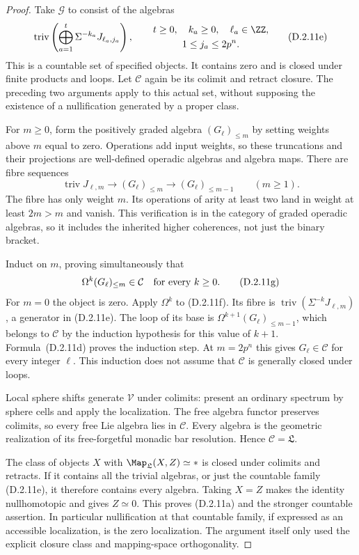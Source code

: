 \begin{proof}
Take $\mathcal G$ to consist of the algebras
\[
 \operatorname{triv}
 \left(\bigoplus_{a=1}^t
       \Sigma^{-k_a}J_{\ell_a,j_a}\right),
 \qquad
 \begin{gathered}
 t\geq0,\quad k_a\geq0,\quad \ell_a\in\ZZ,\\
 1\leq j_a\leq2p^n.
 \end{gathered}
 \tag{D.2.11e}
\]
This is a countable set of specified objects. It contains zero
and is closed under finite products and loops. Let $\mathcal C$
again be its colimit and retract closure. The preceding two
arguments apply to this actual set, without supposing the
existence of a nullification generated by a proper class.

For $m\geq0$, form the positively graded algebra
$(G_\ell)_{\leq m}$ by setting weights above $m$ equal to zero.
Operations add input weights, so these truncations and their
projections are well-defined operadic algebras and algebra maps.
There are fibre sequences
\[
 \operatorname{triv}J_{\ell,m}\longrightarrow
 (G_\ell)_{\leq m}\longrightarrow(G_\ell)_{\leq m-1}
 \qquad(m\geq1).
 \tag{D.2.11f}
\]
The fibre has only weight $m$. Its operations of arity at least
two land in weight at least $2m>m$ and vanish. This verification
is in the category of graded operadic algebras, so it includes
the inherited higher coherences, not just the binary bracket.

Induct on $m$, proving simultaneously that
\[
 \Omega^k(G_\ell)_{\leq m}\in\mathcal C
                   \quad\hbox{for every }k\geq0.
 \tag{D.2.11g}
\]
For $m=0$ the object is zero. Apply $\Omega^k$ to
\textup{(D.2.11f)}. Its fibre is
$\operatorname{triv}(\Sigma^{-k}J_{\ell,m})$, a generator in
\textup{(D.2.11e)}. The loop of its base is
$\Omega^{k+1}(G_\ell)_{\leq m-1}$, which belongs to
$\mathcal C$ by the induction hypothesis for this value of
$k+1$. Formula~\textup{(D.2.11d)} proves the induction step.
At $m=2p^n$ this gives $G_\ell\in\mathcal C$ for every
integer $\ell$. This induction does not assume that
$\mathcal C$ is generally closed under loops.

Local sphere shifts generate $\mathcal V$ under colimits:
present an ordinary spectrum by sphere cells and apply the
localization. The free algebra functor preserves colimits, so
every free Lie algebra lies in $\mathcal C$. Every algebra is
the geometric realization of its free-forgetful monadic bar
resolution. Hence $\mathcal C=\mathfrak L$.

The class of objects $X$ with $\Map_{\mathfrak L}(X,Z)\simeq *$
is closed under colimits and retracts. If it contains all the
trivial algebras, or just the countable family
\textup{(D.2.11e)}, it therefore contains every algebra. Taking
$X=Z$ makes the identity nullhomotopic and gives $Z\simeq0$.
This proves \textup{(D.2.11a)} and the stronger countable
assertion. In particular nullification at that countable family,
if expressed as an accessible localization, is the zero
localization. The argument itself only used the explicit
closure class and mapping-space orthogonality.


\end{proof}
